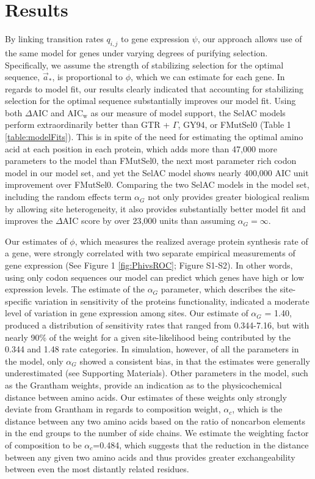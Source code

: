 \documentclass{article}
\newcommand{\DeltaAIC}{\ensuremath{\Delta\text{AIC}}\xspace}
\newcommand{\AICw}{\ensuremath{\text{AIC}_\text{w}}\xspace}
\newcommand{\alphac}{\ensuremath{\alpha_c}\xspace}
\newcommand{\alphag}{\ensuremath{\alpha_G}\xspace}
\newcommand{\aoptvec}{\ensuremath{\Vec{a}_*}\xspace}
\newcommand{\qij}{\ensuremath{q_{i,j}}\xspace}
\begin{document}
\section*{Results}
By linking transition rates $\qij$ to gene expression $\psi$, our approach allows use of the same model for genes under varying degrees of purifying selection.
Specifically, we assume the strength of stabilizing selection for the optimal sequence, \aoptvec, is proportional to $\phi$, which we can estimate for each gene. 
In regards to model fit, our results clearly indicated that accounting for stabilizing selection for the optimal sequence substantially improves our model fit.
Using both \DeltaAIC and \AICw as our measure of model support, the SelAC models perform extraordinarily better than GTR + $\Gamma$, GY94, or FMutSel0 (Table 1 \ref{table:modelFits}).
This is in spite of the need for estimating the optimal amino acid at each position in each protein, which adds more than 47,000 more parameters to the model than FMutSel0, the next most parameter rich codon model in our model set, and yet the SelAC model shows nearly 400,000 AIC unit improvement over FMutSel0.
Comparing the two SelAC models in the model set, including the random effects term $\alphag$ not only provides greater biological realism by allowing site heterogeneity, it also provides substantially better model fit and improves the \DeltaAIC score by over 23,000 units than assuming $\alphag = \infty$. 

Our estimates of $\phi$, which measures the realized average protein synthesis rate of a gene, were strongly correlated with two separate empirical measurements of gene expression (See Figure 1 \ref{fig:PhivsROC}; Figure S1-S2).
In other words, using only codon sequences our model can predict which genes have high or low expression levels.
The estimate of the $\alphag$ parameter, which describes the site-specific variation in sensitivity of the proteins functionality, indicated a moderate level of variation in gene expression among sites.
Our estimate of $\alphag$ = 1.40, produced a distribution of sensitivity rates that ranged from 0.344-7.16, but with nearly 90\% of the weight for a given site-likelihood being contributed by the 0.344 and 1.48 rate categories.
In simulation, however, of all the parameters in the model, only $\alphag$ showed a consistent bias, in that the estimates were generally underestimated (see Supporting Materials).
Other parameters in the model, such as the Grantham weights, provide an indication as to the physicochemical distance between amino acids.
Our estimates of these weights only strongly deviate from Grantham in regards to composition weight, $\alphac$, which is the distance between any two amino acids based on the ratio of noncarbon elements in the end groups to the number of side chains.
We estimate the weighting factor of composition to be $\alphac$=0.484, which suggests that the reduction in the distance between any given two amino acids and thus provides greater exchangeability between even the most distantly related residues.
\end{document}
